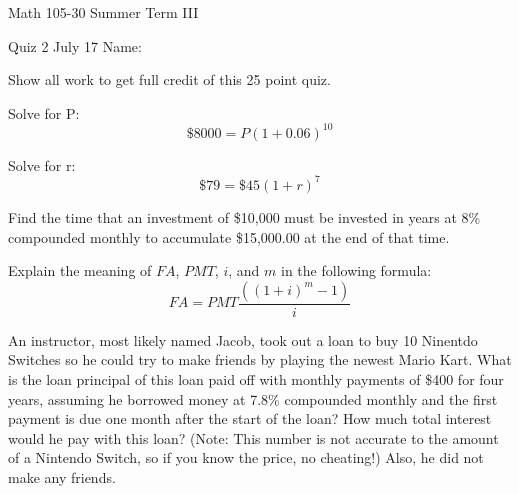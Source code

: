 \documentclass[11pt,epsfig]{article}
\begin{document}
Math 105-30 Summer Term III 

Quiz 2 July 17 \hspace{1.9in} {Name:} {\underline {\hspace{3.5in}}}
\vspace{2pc}

Show all work to get full credit of this 25 point quiz.
\vspace{2pc}

\begin{problem}{5}
Solve for P:
\begin{equation*}
\$8000=P{(1+0.06)}^{10}
\end{equation*}
\vfill
\end{problem}

\begin{problem}{5}
Solve for r:
\begin{equation*}
\$79=\$45(1+r)^7
\end{equation*}
\vfill
\end{problem}

\begin{problem}{5}
Find the time that an investment of \$10,000 must be invested in years at 8\% compounded monthly to accumulate \$15,000.00 at the end of that time.

\vfill
\end{problem}

\newpage

\begin{problem}{4}
Explain the meaning of $FA$, $PMT$, $i$, and $m$ in the following formula:
\begin{equation*}
FA = PMT \frac{((1+i)^m -1)}{i}
\end{equation*}

\vfill
\end{problem}

\begin{problem}{6}
An instructor, most likely named Jacob, took out a loan to buy 10 Ninentdo Switches so he could try to make friends by playing the newest Mario Kart. What is the loan principal of this loan paid off with monthly payments of \$400 for four years, assuming he borrowed money at 7.8\% compounded monthly and the first payment is due one month after the start of the loan? How much total interest would he pay with this loan? (Note: This number is not accurate to the amount of a Nintendo Switch, so if you know the price, no cheating!) Also, he did not make any friends.
\vfill
\end{problem}

\showpoints
\end{document}
